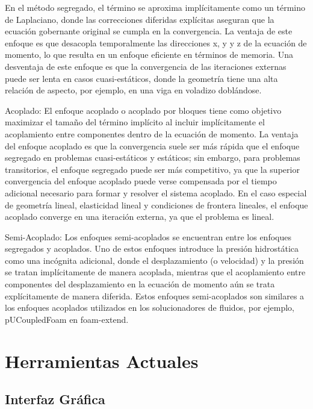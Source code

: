 \documentclass{article}
\begin{document}
En el método segregado, el término se aproxima implícitamente como un término de Laplaciano, donde las correcciones diferidas explícitas aseguran que la ecuación gobernante original se cumpla en la convergencia. La ventaja de este enfoque es que desacopla temporalmente las direcciones x, y y z de la ecuación de momento, lo que resulta en un enfoque eficiente en términos de memoria. Una desventaja de este enfoque es que la convergencia de las iteraciones externas puede ser lenta en casos cuasi-estáticos, donde la geometría tiene una alta relación de aspecto, por ejemplo, en una viga en voladizo doblándose.

Acoplado: El enfoque acoplado o acoplado por bloques tiene como objetivo maximizar el tamaño del término implícito al incluir implícitamente el acoplamiento entre componentes dentro de la ecuación de momento. La ventaja del enfoque acoplado es que la convergencia suele ser más rápida que el enfoque segregado en problemas cuasi-estáticos y estáticos; sin embargo, para problemas transitorios, el enfoque segregado puede ser más competitivo, ya que la superior convergencia del enfoque acoplado puede verse compensada por el tiempo adicional necesario para formar y resolver el sistema acoplado. En el caso especial de geometría lineal, elasticidad lineal y condiciones de frontera lineales, el enfoque acoplado converge en una iteración externa, ya que el problema es lineal.

Semi-Acoplado: Los enfoques semi-acoplados se encuentran entre los enfoques segregados y acoplados. Uno de estos enfoques introduce la presión hidrostática como una incógnita adicional, donde el desplazamiento (o velocidad) y la presión se tratan implícitamente de manera acoplada, mientras que el acoplamiento entre componentes del desplazamiento en la ecuación de momento aún se trata explícitamente de manera diferida. Estos enfoques semi-acoplados son similares a los enfoques acoplados utilizados en los solucionadores de fluidos, por ejemplo, pUCoupledFoam en foam-extend.

\newline
\section{Herramientas Actuales}
\subsection{Interfaz Gráfica}
\end{document}
